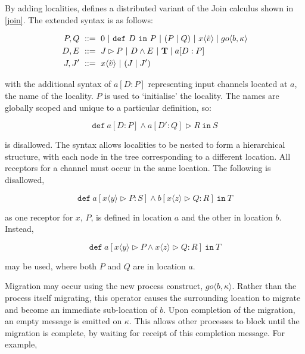 By adding localities, \cite{djoin} defines a distributed variant of the
Join calculus shown in \ref{join}.  The extended syntax is as follows:

\begin{align}
\label{djoinsyntax}
  P, Q\ & ::=\ 
  0\ |\ 
  \mathtt{def}\ D\ \mathtt{in}\ P\ |\
  (P\;|\;Q)\ |\ 
  x\langle \tilde{v} \rangle \pc
  go \langle b, \kappa \rangle \\
  D, E\ & ::=\
  J \rhd P\ |\
  D \wedge E\ |\ 
  \mathbf{T} \pc 
 a[D : P]
 \\
  J,J^\prime\ & ::=\ 
  x\langle \tilde{v} \rangle\ |\
  (J\;|\;J^\prime)
\end{align}

\noindent with the additional syntax of $a[D : P]$ representing input
channels located at $a$, the name of the locality. $P$ is used to
`initialise' the locality.  The names are globally scoped and unique
to a particular definition, so:

\begin{equation}
\mathtt{def}\ a[D:P] \wedge a[D':Q] \rhd R\ \mathtt{in}\ S
\end{equation}

\noindent is disallowed.  The syntax allows localities to be nested to
form a hierarchical structure, with each node in the tree
corresponding to a different location.  All receptors for a channel
must occur in the same location.  The following is disallowed,

\begin{equation}
  \mathtt{def}\ a[x \langle y \rangle \rhd P : S] \wedge b[x \langle z \rangle \rhd Q : R]\ \mathtt{in}\ T
\end{equation}

\noindent as one receptor for $x$, $P$, is defined in location $a$ and
the other in location $b$.  Instead, 

\begin{equation}
  \mathtt{def}\ a[x \langle y \rangle \rhd P \wedge x \langle z \rangle \rhd Q : R]\ \mathtt{in}\ T
\end{equation}

\noindent may be used, where both $P$ and $Q$ are in location $a$.

Migration may occur using the new process construct, $go \langle b,
\kappa \rangle$.  Rather than the process itself migrating, this
operator causes the surrounding location to migrate and become an
immediate sub-location of $b$.  Upon completion of the migration, an
empty message is emitted on $\kappa$.  This allows other processes to
block until the migration is complete, by waiting for receipt of this
completion message.  For example,

